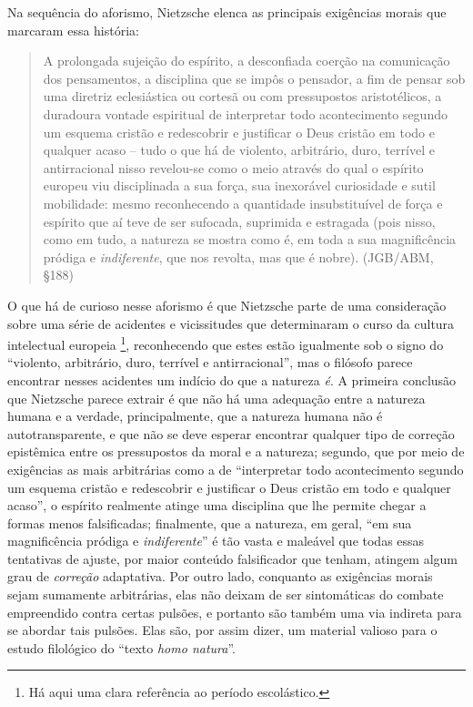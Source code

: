 \documentclass[
	12pt,				%
	openright,			%
	oneside,			%
	a4paper,			%
	english,			%
	french,				%
	spanish,			%
	brazil				%
	]{abntex2}
\begin{document}
	Na sequência do aforismo, Nietzsche elenca as principais exigências morais que marcaram essa história:

\begin{quotation}
A prolongada sujeição do espírito, a desconfiada coerção na comunicação dos pensamentos, a disciplina que se impôs o pensador, a fim de pensar sob uma diretriz eclesiástica ou cortesã ou com pressupostos aristotélicos, a duradoura vontade espiritual de interpretar todo acontecimento segundo um esquema cristão e redescobrir e justificar o Deus cristão em todo e qualquer acaso – tudo o que há de violento, arbitrário, duro, terrível e antirracional nisso revelou-se como o meio através do qual o espírito europeu viu disciplinada a sua força, sua inexorável curiosidade e sutil mobilidade: mesmo reconhecendo a quantidade insubstituível de força e espírito que aí teve de ser sufocada, suprimida e estragada (pois nisso, como em tudo, a natureza se mostra como é, em toda a sua magnificência pródiga e \textit{indiferente}, que nos revolta, mas que é nobre). (JGB/ABM, §188)
\end{quotation}

O que há de curioso nesse aforismo é que Nietzsche parte de uma consideração sobre uma série de acidentes e vicissitudes que determinaram o curso da cultura intelectual europeia
\footnote{Há aqui uma clara referência ao período escolástico.}, reconhecendo que estes estão igualmente sob o signo do “violento, arbitrário, duro, terrível e antirracional”, mas o filósofo parece encontrar nesses acidentes um indício do que a natureza \textit{é}. A primeira conclusão que Nietzsche parece extrair é que não há uma adequação entre a natureza humana e a verdade, principalmente, que a natureza humana não é autotransparente, e que não se deve esperar encontrar qualquer tipo de correção epistêmica entre os pressupostos da moral e a natureza; segundo, que por meio de exigências as mais arbitrárias como a de “interpretar todo acontecimento segundo um esquema cristão e redescobrir e justificar o Deus cristão em todo e qualquer acaso”, o espírito realmente atinge uma disciplina que lhe permite chegar a formas menos falsificadas; finalmente, que a natureza, em geral, “em sua magnificência pródiga e \textit{indiferente}” é tão vasta e maleável que todas essas tentativas de ajuste, por maior conteúdo falsificador que tenham, atingem algum grau de \textit{correção} adaptativa. Por outro lado, conquanto as exigências morais sejam sumamente arbitrárias, elas não deixam de ser sintomáticas do combate empreendido contra certas pulsões, e portanto são também uma via indireta para se abordar tais pulsões. Elas são, por assim dizer, um material valioso para o estudo filológico do “texto \textit{homo natura}”.
\end{document}
